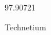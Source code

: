 \documentclass[12pt]{article}
\begin{document}
\hfill{}
\vfill
\begin{center}
  {\fontsize{50}{60}
  }

  97.90721

Technetium
\end{center}
\vfill
\end{document}
